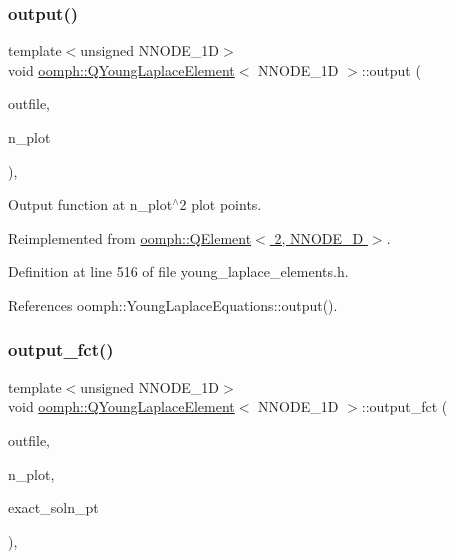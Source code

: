 \subsubsection{\texorpdfstring{output()}{output()}\hspace{0.1cm}{\footnotesize\ttfamily [2/2]}}
{\footnotesize\ttfamily template$<$unsigned N\+N\+O\+D\+E\+\_\+1D$>$ \\
void \hyperlink{classoomph_1_1QYoungLaplaceElement}{oomph\+::\+Q\+Young\+Laplace\+Element}$<$ N\+N\+O\+D\+E\+\_\+1D $>$\+::output (\begin{DoxyParamCaption}\item[{std\+::ostream \&}]{outfile,  }\item[{const unsigned \&}]{n\+\_\+plot }\end{DoxyParamCaption})\hspace{0.3cm}{\ttfamily [inline]}, {\ttfamily [virtual]}}



Output function at n\+\_\+plot$^\wedge$2 plot points. 



Reimplemented from \hyperlink{classoomph_1_1QElement_3_012_00_01NNODE__1D_01_4_a865e3a77ee4cb67e7fcd7eca42d256f1}{oomph\+::\+Q\+Element$<$ 2, N\+N\+O\+D\+E\+\_\+D $>$}.



Definition at line 516 of file young\+\_\+laplace\+\_\+elements.\+h.



References oomph\+::\+Young\+Laplace\+Equations\+::output().

\mbox{\label{classoomph_1_1QYoungLaplaceElement_a617863102f725a73a8768ba8e3da896d}} 
\subsubsection{\texorpdfstring{output\+\_\+fct()}{output\_fct()}\hspace{0.1cm}{\footnotesize\ttfamily [1/2]}}
{\footnotesize\ttfamily template$<$unsigned N\+N\+O\+D\+E\+\_\+1D$>$ \\
void \hyperlink{classoomph_1_1QYoungLaplaceElement}{oomph\+::\+Q\+Young\+Laplace\+Element}$<$ N\+N\+O\+D\+E\+\_\+1D $>$\+::output\+\_\+fct (\begin{DoxyParamCaption}\item[{std\+::ostream \&}]{outfile,  }\item[{const unsigned \&}]{n\+\_\+plot,  }\item[{\hyperlink{classoomph_1_1FiniteElement_a690fd33af26cc3e84f39bba6d5a85202}{Finite\+Element\+::\+Steady\+Exact\+Solution\+Fct\+Pt}}]{exact\+\_\+soln\+\_\+pt }\end{DoxyParamCaption})\hspace{0.3cm}{\ttfamily [inline]}, {\ttfamily [virtual]}}



